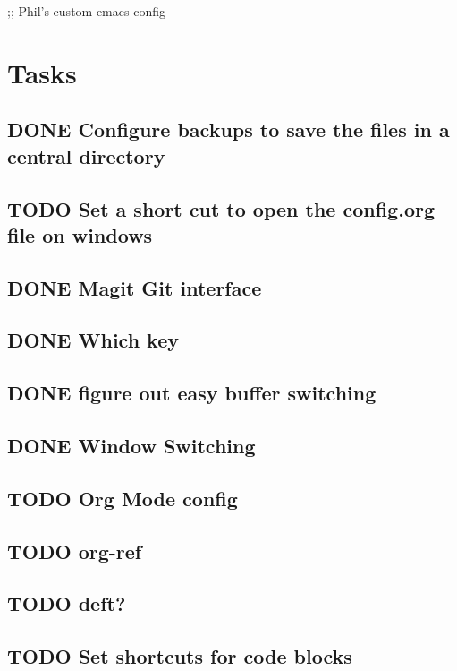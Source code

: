 \documentclass[11pt]{article}
\author{Phil McCredden}
\date{\today}
\title{}
\begin{document}
\tableofcontents

;; Phil's custom emacs config

\section{Tasks}
\label{sec:org6f79c34}
\subsection{{\bfseries\sffamily DONE} Configure backups to save the files in a central directory}
\label{sec:org9ae526e}
\subsection{{\bfseries\sffamily TODO} Set a short cut to open the config.org file on windows}
\label{sec:org3c7f11f}
\subsection{{\bfseries\sffamily DONE} Magit Git interface}
\label{sec:orgddfff12}
\subsection{{\bfseries\sffamily DONE} Which key}
\label{sec:org1ef652f}
\subsection{{\bfseries\sffamily DONE} figure out easy buffer switching}
\label{sec:org3835e4d}
\subsection{{\bfseries\sffamily DONE} Window Switching}
\label{sec:orgf60ae7f}
\subsection{{\bfseries\sffamily TODO} Org Mode config}
\label{sec:org7c49213}
\subsection{{\bfseries\sffamily TODO} org-ref}
\label{sec:orgb3c4923}

\subsection{{\bfseries\sffamily TODO} deft?}
\label{sec:org61fca6e}
\subsection{{\bfseries\sffamily TODO} Set shortcuts for code blocks}
\label{sec:orge109664}
\end{document}
